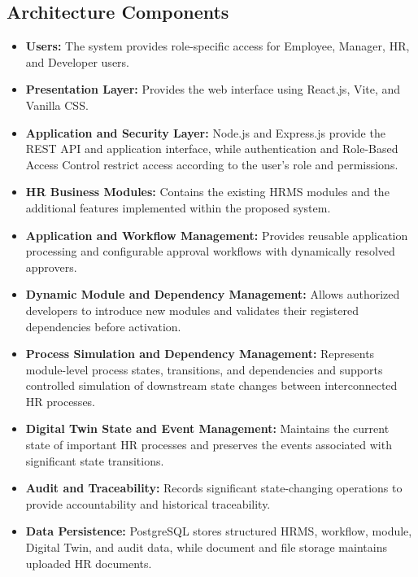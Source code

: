 \documentclass[12pt,a4paper]{article}
\begin{document}
\subsection{Architecture Components}

\begin{itemize}

    \item \textbf{Users:}
    The system provides role-specific access for Employee, Manager,
    HR, and Developer users.

    \item \textbf{Presentation Layer:}
    Provides the web interface using React.js, Vite, and
    Vanilla CSS.

    \item \textbf{Application and Security Layer:}
    Node.js and Express.js provide the REST API and application interface, while
    authentication and Role-Based Access Control restrict access
    according to the user's role and permissions.

    \item \textbf{HR Business Modules:}
    Contains the existing HRMS modules and the additional features
    implemented within the proposed system.

    \item \textbf{Application and Workflow Management:}
    Provides reusable application processing and configurable
    approval workflows with dynamically resolved approvers.

    \item \textbf{Dynamic Module and Dependency Management:}
    Allows authorized developers to introduce new modules and
    validates their registered dependencies before activation.

    \item \textbf{Process Simulation and Dependency Management:}
    Represents module-level process states, transitions, and
    dependencies and supports controlled simulation of downstream
    state changes between interconnected HR processes.

    \item \textbf{Digital Twin State and Event Management:}
    Maintains the current state of important HR processes and
    preserves the events associated with significant state
    transitions.

    \item \textbf{Audit and Traceability:}
    Records significant state-changing operations to provide
    accountability and historical traceability.

    \item \textbf{Data Persistence:}
    PostgreSQL stores structured HRMS, workflow, module, Digital
    Twin, and audit data, while document and file storage maintains
    uploaded HR documents.

\end{itemize}
\end{document}
